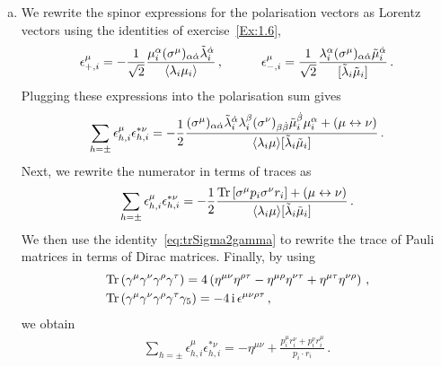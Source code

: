 \begin{enumerate}[a)]
\smallskip

\item 
We rewrite the spinor expressions for the polarisation vectors as Lorentz vectors using the identities of exercise~\ref{Ex:1.6},
\begin{align}
\epsilon_{+,i}^{\mu} = -\frac{1}{\sqrt{2}} \frac{ \mu_i^{\alpha} (\sigma^{\mu})_{\alpha\dot{\alpha}} \tilde{\lambda}_i^{\dot{\alpha}}}{\langle \lambda_i \mu_i \rangle} \,, \qquad \quad
  \epsilon_{-,i}^{\mu} = \frac{1}{\sqrt{2}} \frac{ \lambda_i^{\alpha} (\sigma^{\mu})_{\alpha\dot{\alpha}} \tilde{\mu}_i^{\dot{\alpha}}}{[ \tilde{\lambda}_i \tilde{\mu}_i ]} \,.
\end{align}
Plugging these expressions into the polarisation sum gives
\begin{align}
\sum_{h=\pm} \epsilon_{h,i}^{\mu} \epsilon_{h,i}^{* \nu} = -\frac{1}{2} \frac{  (\sigma^{\mu})_{\alpha\dot{\alpha}} \tilde{\lambda}_i^{\dot{\alpha}} \lambda_i^{\beta}
  (\sigma^{\nu})_{\beta\dot{\beta}}  \tilde{\mu}_i^{\dot{\beta}} \mu_i^{\alpha} +
 \left(\mu \leftrightarrow \nu \right)}{\langle \lambda_i \mu \rangle [ \tilde{\lambda}_i \tilde{\mu}_i ]} \,.
\end{align}
Next, we rewrite the numerator in terms of traces as
\begin{align}
\sum_{h=\pm} \epsilon_{h,i}^{\mu} \epsilon_{h,i}^{* \nu} = -\frac{1}{2} \frac{\text{Tr}\left[\sigma^{\mu} p_i \sigma^{\nu} r_i \right]+
 \left(\mu \leftrightarrow \nu \right)}{\langle \lambda_i \mu \rangle [ \tilde{\lambda}_i \tilde{\mu}_i ]} \,.
\end{align}
We then use the identity~\eqref{eq:trSigma2gamma} to rewrite the trace of Pauli matrices in terms of Dirac matrices. Finally, by using
\begin{align} \label{eq:gamma_traces}
\begin{aligned}
& \mathop{\mathrm{Tr}}\left(\gamma^{\mu} \gamma^{\nu} \gamma^{\rho} \gamma^{\tau}\right) = 4 \left(\eta^{\mu \nu} \eta^{\rho \tau} - \eta^{\mu \rho} \eta^{\nu \tau} + \eta^{\mu \tau} \eta^{\nu \rho} \right) \,, \\
& \mathop{\mathrm{Tr}}\left(\gamma^{\mu} \gamma^{\nu} \gamma^{\rho} \gamma^{\tau} \gamma_5 \right) = - 4 \, \mathrm{i} \, \epsilon^{\mu \nu \rho \tau} \,,
\end{aligned}
\end{align}
we obtain
\begin{align}
\sum_{h=\pm} \epsilon_{h,i}^{\mu} \epsilon_{h,i}^{* \nu}  = -\eta^{\mu\nu} + \frac{p_i^{\mu} r_i^{\nu}+p_i^{\nu} r_i^{\mu}}{p_i \cdot r_i} \,.
\end{align}

\end{enumerate}


